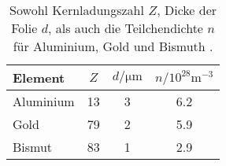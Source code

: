 \begin{table}
\centering 
   \caption{Sowohl Kernladungszahl $Z$, Dicke der Folie $d$, als auch die Teilchendichte $n$ für Aluminium, Gold und Bismuth \cite{Elemente16}.} 
   \label{tab:zWerte}
    \begin{tabular}{lS[table-format=2.0]S[table-format=1.0]S[table-format=1.1]}
        \toprule
        {Element} & {$Z$} & {$d/\si{\micro\metre}$} & {$n/10^{28}\si{\metre^{-3}}$} \\
        \midrule
        {Aluminium} & 13 & 3 & 6.2  \\
        {Gold} & 79 & 2 & 5.9  \\
        {Bismut} & 83 & 1 & 2.9  \\
        \bottomrule
    \end{tabular}
\end{table}